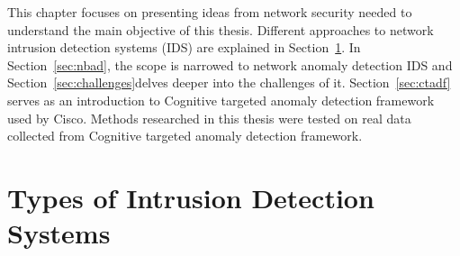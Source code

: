 \documentclass[thesis=B,english]{FITthesis}[2012/10/20]
\begin{document}
This chapter focuses on presenting ideas from network security needed to understand the main objective of this thesis.
Different approaches to network intrusion detection systems (IDS) are explained in Section~\ref{sec:ids}.
In Section~\ref{sec:nbad}, the scope is narrowed to network anomaly detection IDS and Section~\ref{sec:challenges}delves deeper into the challenges of it.
Section~\ref{sec:ctadf} serves as an introduction to Cognitive targeted anomaly detection framework used by Cisco.
Methods researched in this thesis were tested on real data collected from Cognitive targeted anomaly detection framework. \\

\section{Types of Intrusion Detection Systems}\label{sec:ids}
\end{document}
